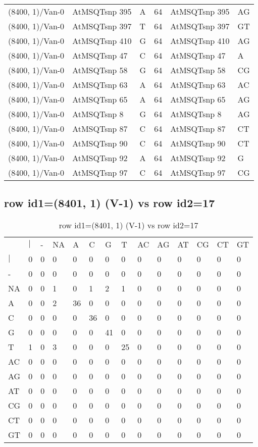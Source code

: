 \begin{center}
\begin{longtable}{|l|l|l|l|l|l|}
(8400, 1)/Van-0&AtMSQTsnp 395&A&64&AtMSQTsnp 395&AG\\
(8400, 1)/Van-0&AtMSQTsnp 397&T&64&AtMSQTsnp 397&GT\\
(8400, 1)/Van-0&AtMSQTsnp 410&G&64&AtMSQTsnp 410&AG\\
(8400, 1)/Van-0&AtMSQTsnp 47&C&64&AtMSQTsnp 47&A\\
(8400, 1)/Van-0&AtMSQTsnp 58&G&64&AtMSQTsnp 58&CG\\
(8400, 1)/Van-0&AtMSQTsnp 63&A&64&AtMSQTsnp 63&AC\\
(8400, 1)/Van-0&AtMSQTsnp 65&A&64&AtMSQTsnp 65&AG\\
(8400, 1)/Van-0&AtMSQTsnp 8&G&64&AtMSQTsnp 8&AG\\
(8400, 1)/Van-0&AtMSQTsnp 87&C&64&AtMSQTsnp 87&CT\\
(8400, 1)/Van-0&AtMSQTsnp 90&C&64&AtMSQTsnp 90&CT\\
(8400, 1)/Van-0&AtMSQTsnp 92&A&64&AtMSQTsnp 92&G\\
(8400, 1)/Van-0&AtMSQTsnp 97&C&64&AtMSQTsnp 97&CG\\
\hline
\end{longtable}
\end{center}

\subsection{row id1=(8401, 1) (V-1) vs row id2=17}
\begin{center}
\begin{longtable}{|l|l|l|l|l|l|l|l|l|l|l|l|l|l|}
\caption{row id1=(8401, 1) (V-1) vs row id2=17} \label{table_dm658}\\
\hline
\\
\hline
&$|$&-&NA&A&C&G&T&AC&AG&AT&CG&CT&GT\\
$|$&0&0&0&0&0&0&0&0&0&0&0&0&0\\
-&0&0&0&0&0&0&0&0&0&0&0&0&0\\
NA&0&0&1&0&1&2&1&0&0&0&0&0&0\\
A&0&0&2&36&0&0&0&0&0&0&0&0&0\\
C&0&0&0&0&36&0&0&0&0&0&0&0&0\\
G&0&0&0&0&0&41&0&0&0&0&0&0&0\\
T&1&0&3&0&0&0&25&0&0&0&0&0&0\\
AC&0&0&0&0&0&0&0&0&0&0&0&0&0\\
AG&0&0&0&0&0&0&0&0&0&0&0&0&0\\
AT&0&0&0&0&0&0&0&0&0&0&0&0&0\\
CG&0&0&0&0&0&0&0&0&0&0&0&0&0\\
CT&0&0&0&0&0&0&0&0&0&0&0&0&0\\
GT&0&0&0&0&0&0&0&0&0&0&0&0&0\\
\hline
\end{longtable}
\end{center}

